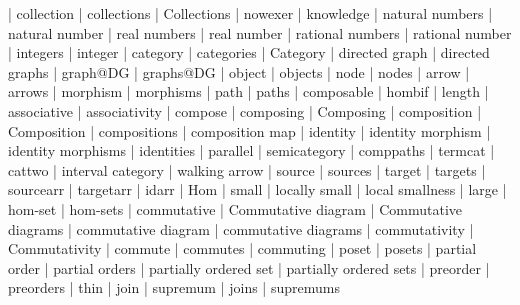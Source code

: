     |   collection
    |   collections
    |   Collections
    |   nowexer
    |   knowledge
    |   natural numbers
    |   natural number
    |   real numbers
    |   real number
    |   rational numbers
    |   rational number
    |   integers
    |   integer
    |   category
    |   categories
    |   Category
    |   directed graph
    |   directed graphs
    |   graph@DG
    |   graphs@DG
    |   object
    |   objects
    |   node
    |   nodes
    |   arrow
    |   arrows
    |   morphism
    |   morphisms
    |   path
    |   paths
    |   composable
    |   hombif
    |   length
    |   associative
    |   associativity
    |   compose
    |   composing
    |   Composing
    |   composition
    |   Composition
    |   compositions
    |   composition map
    |   identity
    |   identity morphism
    |   identity morphisms
    |   identities
    |   parallel
    |   semicategory
    |   comppaths
    |   termcat
    |   cattwo
    |   interval category
    |   walking arrow
    |   source
    |   sources
    |   target
    |   targets
    |   sourcearr
    |   targetarr
    |   idarr
    |   Hom
    |   small
    |   locally small
    |   local smallness
    |   large
    |   hom-set
    |   hom-sets
    |   commutative
    |   Commutative diagram
    |   Commutative diagrams
    |   commutative diagram
    |   commutative diagrams
    |   commutativity
    |   Commutativity
    |   commute
    |   commutes
    |   commuting
    |   poset
    |   posets
    |   partial order
    |   partial orders
    |   partially ordered set
    |   partially ordered sets
    |   preorder
    |   preorders
    |   thin
    |   join
    |   supremum
    |   joins
    |   supremums

